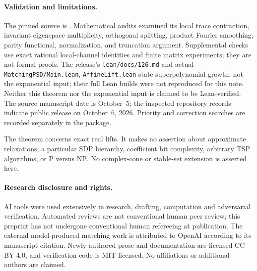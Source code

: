 \documentclass[11pt]{article}
\begin{document}
\paragraph{Validation and limitations.}
The pinned source is . Mathematical audits examined its local trace contraction, invariant eigenspace multiplicity, orthogonal splitting, product Fourier smoothing, parity functional, normalization, and truncation argument. Supplemental checks use exact rational local-channel identities and finite matrix experiments; they are not formal proofs. The release's \texttt{lean/docs/126.md} and actual \texttt{MatchingPSD/Main.lean}, \texttt{AffineLift.lean} state superpolynomial growth, not the exponential input; their full Lean builds were not reproduced for this note. Neither this theorem nor the exponential input is claimed to be Lean-verified. The source manuscript date is October~5; the inspected repository records indicate public release on October~6, 2026. Priority and correction searches are recorded separately in the package.

The theorem concerns exact real lifts. It makes no assertion about approximate relaxations, a particular SDP hierarchy, coefficient bit complexity, arbitrary TSP algorithms, or $\mathrm P$ versus $\mathrm{NP}$. No complex-cone or stable-set extension is asserted here.

\paragraph{Research disclosure and rights.}
AI tools were used extensively in research, drafting, computation and adversarial verification. Automated reviews are not conventional human peer review; this preprint has not undergone conventional human refereeing at publication. The external model-produced matching work is attributed to OpenAI according to its manuscript citation. Newly authored prose and documentation are licensed CC BY 4.0, and verification code is MIT licensed. No affiliations or additional authors are claimed.
\end{document}
